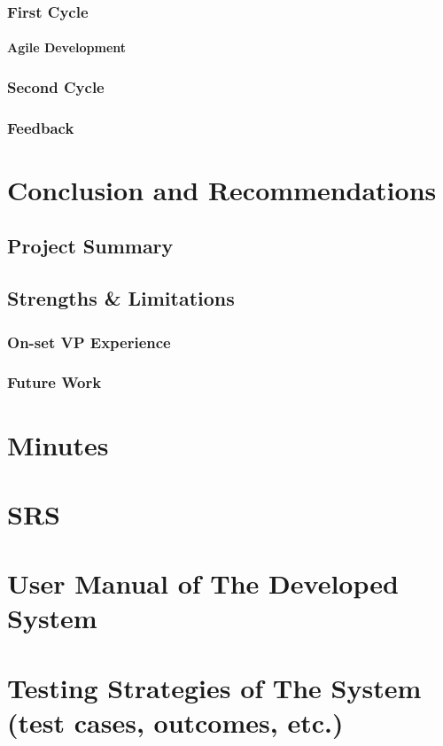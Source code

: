 \documentclass[12pt,a4paper]{report}
\begin{document}
\subsection{First Cycle}

\subsubsection{Agile Development}

\subsection{Second Cycle}

\subsection{Feedback}


\chapter{Conclusion and Recommendations}

\section{Project Summary}

\section{Strengths \& Limitations}

\subsection{On-set VP Experience}

\subsection{Future Work}


\appendix

\chapter{Minutes}

\chapter{SRS}

\chapter{User Manual of The Developed System}

\chapter{Testing Strategies of The System (test cases, outcomes, etc.)}




\end{document}
